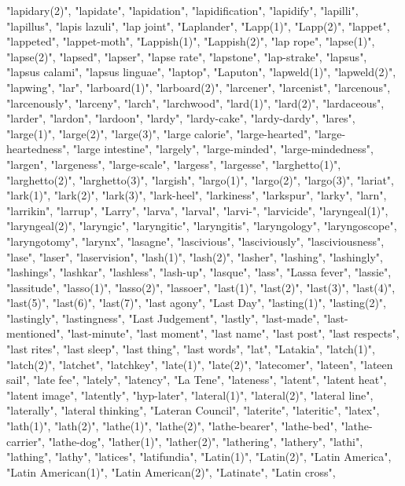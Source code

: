 "lapidary(2)",
"lapidate",
"lapidation",
"lapidification",
"lapidify",
"lapilli",
"lapillus",
"lapis lazuli",
"lap joint",
"Laplander",
"Lapp(1)",
"Lapp(2)",
"lappet",
"lappeted",
"lappet-moth",
"Lappish(1)",
"Lappish(2)",
"lap rope",
"lapse(1)",
"lapse(2)",
"lapsed",
"lapser",
"lapse rate",
"lapstone",
"lap-strake",
"lapsus",
"lapsus calami",
"lapsus linguae",
"laptop",
"Laputon",
"lapweld(1)",
"lapweld(2)",
"lapwing",
"lar",
"larboard(1)",
"larboard(2)",
"larcener",
"larcenist",
"larcenous",
"larcenously",
"larceny",
"larch",
"larchwood",
"lard(1)",
"lard(2)",
"lardaceous",
"larder",
"lardon",
"lardoon",
"lardy",
"lardy-cake",
"lardy-dardy",
"lares",
"large(1)",
"large(2)",
"large(3)",
"large calorie",
"large-hearted",
"large-heartedness",
"large intestine",
"largely",
"large-minded",
"large-mindedness",
"largen",
"largeness",
"large-scale",
"largess",
"largesse",
"larghetto(1)",
"larghetto(2)",
"larghetto(3)",
"largish",
"largo(1)",
"largo(2)",
"largo(3)",
"lariat",
"lark(1)",
"lark(2)",
"lark(3)",
"lark-heel",
"larkiness",
"larkspur",
"larky",
"larn",
"larrikin",
"larrup",
"Larry",
"larva",
"larval",
"larvi-",
"larvicide",
"laryngeal(1)",
"laryngeal(2)",
"laryngic",
"laryngitic",
"laryngitis",
"laryngology",
"laryngoscope",
"laryngotomy",
"larynx",
"lasagne",
"lascivious",
"lasciviously",
"lasciviousness",
"lase",
"laser",
"laservision",
"lash(1)",
"lash(2)",
"lasher",
"lashing",
"lashingly",
"lashings",
"lashkar",
"lashless",
"lash-up",
"lasque",
"lass",
"Lassa fever",
"lassie",
"lassitude",
"lasso(1)",
"lasso(2)",
"lassoer",
"last(1)",
"last(2)",
"last(3)",
"last(4)",
"last(5)",
"last(6)",
"last(7)",
"last agony",
"Last Day",
"lasting(1)",
"lasting(2)",
"lastingly",
"lastingness",
"Last Judgement",
"lastly",
"last-made",
"last-mentioned",
"last-minute",
"last moment",
"last name",
"last post",
"last respects",
"last rites",
"last sleep",
"last thing",
"last words",
"lat",
"Latakia",
"latch(1)",
"latch(2)",
"latchet",
"latchkey",
"late(1)",
"late(2)",
"latecomer",
"lateen",
"lateen sail",
"late fee",
"lately",
"latency",
"La Tene",
"lateness",
"latent",
"latent heat",
"latent image",
"latently",
"hyp-later",
"lateral(1)",
"lateral(2)",
"lateral line",
"laterally",
"lateral thinking",
"Lateran Council",
"laterite",
"lateritic",
"latex",
"lath(1)",
"lath(2)",
"lathe(1)",
"lathe(2)",
"lathe-bearer",
"lathe-bed",
"lathe-carrier",
"lathe-dog",
"lather(1)",
"lather(2)",
"lathering",
"lathery",
"lathi",
"lathing",
"lathy",
"latices",
"latifundia",
"Latin(1)",
"Latin(2)",
"Latin America",
"Latin American(1)",
"Latin American(2)",
"Latinate",
"Latin cross",
